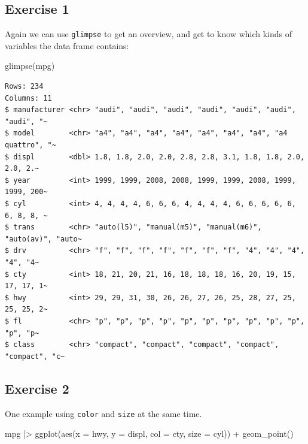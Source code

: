 \documentclass[
  letterpaper,
  DIV=11,
  numbers=noendperiod]{scrreprt}
\newenvironment{Shaded}{\begin{snugshade}}{\end{snugshade}}
\newcommand{\AttributeTok}[1]{\textcolor[rgb]{0.40,0.45,0.13}{#1}}
\newcommand{\FunctionTok}[1]{\textcolor[rgb]{0.28,0.35,0.67}{#1}}
\newcommand{\NormalTok}[1]{\textcolor[rgb]{0.00,0.23,0.31}{#1}}
\newcommand{\SpecialCharTok}[1]{\textcolor[rgb]{0.37,0.37,0.37}{#1}}
\begin{document}
\subsection{Exercise 1}\label{exercise-1-9}

Again we can use \texttt{glimpse} to get an overview, and get to know
which kinds of variables the data frame contains:

\begin{Shaded}
\begin{Highlighting}[]
\FunctionTok{glimpse}\NormalTok{(mpg)}
\end{Highlighting}
\end{Shaded}

\begin{verbatim}
Rows: 234
Columns: 11
$ manufacturer <chr> "audi", "audi", "audi", "audi", "audi", "audi", "audi", "~
$ model        <chr> "a4", "a4", "a4", "a4", "a4", "a4", "a4", "a4 quattro", "~
$ displ        <dbl> 1.8, 1.8, 2.0, 2.0, 2.8, 2.8, 3.1, 1.8, 1.8, 2.0, 2.0, 2.~
$ year         <int> 1999, 1999, 2008, 2008, 1999, 1999, 2008, 1999, 1999, 200~
$ cyl          <int> 4, 4, 4, 4, 6, 6, 6, 4, 4, 4, 4, 6, 6, 6, 6, 6, 6, 8, 8, ~
$ trans        <chr> "auto(l5)", "manual(m5)", "manual(m6)", "auto(av)", "auto~
$ drv          <chr> "f", "f", "f", "f", "f", "f", "f", "4", "4", "4", "4", "4~
$ cty          <int> 18, 21, 20, 21, 16, 18, 18, 18, 16, 20, 19, 15, 17, 17, 1~
$ hwy          <int> 29, 29, 31, 30, 26, 26, 27, 26, 25, 28, 27, 25, 25, 25, 2~
$ fl           <chr> "p", "p", "p", "p", "p", "p", "p", "p", "p", "p", "p", "p~
$ class        <chr> "compact", "compact", "compact", "compact", "compact", "c~
\end{verbatim}

\subsection{Exercise 2}\label{exercise-2-6}

One example using \texttt{color} and \texttt{size} at the same time.

\begin{Shaded}
\begin{Highlighting}[]
\NormalTok{mpg }\SpecialCharTok{|\textgreater{}}
  \FunctionTok{ggplot}\NormalTok{(}\FunctionTok{aes}\NormalTok{(}\AttributeTok{x =}\NormalTok{ hwy, }\AttributeTok{y =}\NormalTok{ displ, }\AttributeTok{col =}\NormalTok{ cty, }\AttributeTok{size =}\NormalTok{ cyl)) }\SpecialCharTok{+}
  \FunctionTok{geom\_point}\NormalTok{()}
\end{Highlighting}
\end{Shaded}
\end{document}
